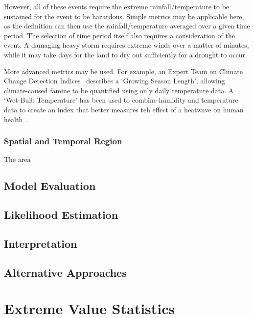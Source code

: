 \documentclass[12pt,a4paper]{report}
\begin{document}
However,
    all of these events require the extreme rainfall/temperature to be sustained for the event to be hazardous.
Simple metrics may be applicable here,
    as the definition can then use the rainfall/temperature averaged over a given time period.
The selection of time period itself also requires a consideration of the event.
A damaging heavy storm requires extreme winds over a matter of minutes,
    while it may take days for the land to dry out sufficiently for a drought to occur.

More advanced metrics may be used.
For example, an Expert Team on Climate Change Detection Indices~\cite{Zhang_2011}
    describes a `Growing Season Length',
    allowing climate-caused famine to be quantified using only daily temperature data.
A `Wet-Bulb Temperature' has been used to combine humidity and temperature data to create an index that better measures teh effect of a heatwave on human health~\cite{Li_2020}.

\subsubsection{Spatial and Temporal Region}

The area

\subsection{Model Evaluation}\label{subsec:backmodeleval}

\subsection{Likelihood Estimation}\label{subsec:backlikeest}

\subsection{Interpretation}\label{subsec:backinterp}

\subsection*{Alternative Approaches}\label{subsec:altappro}

\section{Extreme Value Statistics}\label{sec:exstats}
\end{document}
